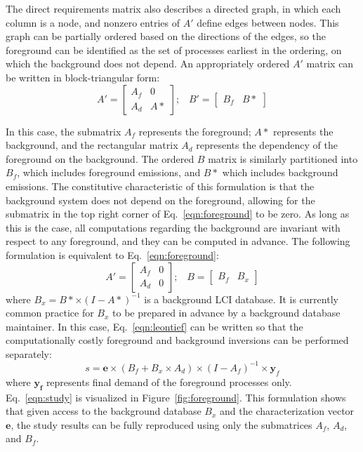 The direct requirements matrix also describes a directed graph, in which each column is a node, and nonzero entries of $A'$ define edges between nodes.  This graph can be partially ordered based on the directions of the edges, so the foreground can be identified as the set of processes earliest in the ordering, on which the background does not depend.  An appropriately ordered $A'$ matrix can be written in block-triangular form:
\begin{equation}
A' = \left[\begin{array}{cc}
A_f & 0 \\
A_d &  A*
  \end{array}
\right];\;\;\;  B' = \left[\begin{array}{cc} B_f & B*   \end{array}\right]
\label{eqn:foreground}
\end{equation}


In this case, the submatrix $A_f$ represents the foreground; $A*$ represents the background, and the rectangular matrix $A_d$ represents the dependency of the foreground on the background.  The ordered $B$ matrix is similarly partitioned into $B_f$, which includes foreground emissions, and $B*$ which includes background emissions. The constitutive characteristic of this formulation is that the background system does not depend on the foreground, allowing for the submatrix in the top right corner of Eq.~\ref{eqn:foreground} to be zero.  As long as this is the case, all computations regarding the background are invariant with respect to any foreground, and they can be computed in advance.  The following formulation is equivalent to Eq.~\ref{eqn:foreground}:
\begin{equation}
 A' = \left[\begin{array}{cc} 
A_f &  0 \\
A_d & 0 
   \end{array}\right];\;\;\;  B = \left[\begin{array}{cc} B_f & B_x \end{array}\right ]
\end{equation}
where $B_x = B* \times (I - A*)^{-1}$ is a background LCI database.  It is currently common practice for $B_x$ to be prepared in advance by a background database maintainer.  In this case, Eq.~\ref{eqn:leontief} can be written so that the computationally costly foreground and background inversions can be performed separately:
\begin{equation}
s = \mathbf{e} \times (B_f + B_x\times A_d) \times (I - A_f)^{-1} \times \mathbf{y}_f
\label{eqn:study}
\end{equation}
where $\mathbf{y_f}$ represents final demand of the foreground processes only.  Eq.~\ref{eqn:study} is visualized in Figure~\ref{fig:foreground}.  This formulation shows that given access to the background database $B_x$ and the characterization vector $\mathbf{e}$, the study results can be fully reproduced using only the submatrices $A_f$, $A_d$, and $B_f$.  %

